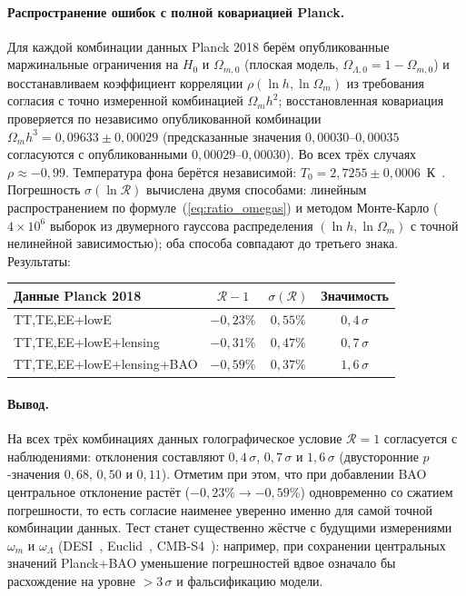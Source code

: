 \documentclass[12pt,a4paper]{article}
\begin{document}
\paragraph{Распространение ошибок с полной ковариацией Planck.}
Для каждой комбинации данных Planck 2018 берём опубликованные маржинальные ограничения на $H_0$ и $\Omega_{m,0}$ (плоская модель, $\Omega_{\Lambda,0}=1-\Omega_{m,0}$) и восстанавливаем коэффициент корреляции $\rho(\ln h, \ln\Omega_m)$ из требования согласия с точно измеренной комбинацией $\Omega_m h^2$; восстановленная ковариация проверяется по независимо опубликованной комбинации $\Omega_m h^3 = 0{,}09633 \pm 0{,}00029$ (предсказанные значения $0{,}00030$--$0{,}00035$ согласуются с опубликованными $0{,}00029$--$0{,}00030$). Во всех трёх случаях $\rho \approx -0{,}99$. Температура фона берётся независимой: $T_0 = 2{,}7255 \pm 0{,}0006$~К~\cite{Fixsen2009}. Погрешность $\sigma(\ln\mathcal{R})$ вычислена двумя способами: линейным распространением по формуле~(\ref{eq:ratio_omegas}) и методом Монте-Карло ($4\times10^6$ выборок из двумерного гауссова распределения $(\ln h, \ln\Omega_m)$ с точной нелинейной зависимостью); оба способа совпадают до третьего знака. Результаты:

\begin{center}
\begin{tabular}{l c c c}
\hline
Данные Planck 2018 & $\mathcal{R}-1$ & $\sigma(\mathcal{R})$ & Значимость \\
\hline
TT,TE,EE+lowE & $-0{,}23\%$ & $0{,}55\%$ & $0{,}4\,\sigma$ \\
TT,TE,EE+lowE+lensing & $-0{,}31\%$ & $0{,}47\%$ & $0{,}7\,\sigma$ \\
TT,TE,EE+lowE+lensing+BAO & $-0{,}59\%$ & $0{,}37\%$ & $1{,}6\,\sigma$ \\
\hline
\end{tabular}
\end{center}

\paragraph{Вывод.}
На всех трёх комбинациях данных голографическое условие $\mathcal{R}=1$ согласуется с наблюдениями: отклонения составляют $0{,}4\,\sigma$, $0{,}7\,\sigma$ и $1{,}6\,\sigma$ (двусторонние $p$-значения $0{,}68$, $0{,}50$ и $0{,}11$). Отметим при этом, что при добавлении BAO центральное отклонение растёт ($-0{,}23\% \to -0{,}59\%$) одновременно со сжатием погрешности, то есть согласие наименее уверенно именно для самой точной комбинации данных. Тест станет существенно жёстче с будущими измерениями $\omega_m$ и $\omega_\Lambda$ (DESI~\cite{DESI2024SV}, Euclid~\cite{Laureijs2011,Euclid2020}, CMB-S4~\cite{Abazajian2016}): например, при сохранении центральных значений Planck+BAO уменьшение погрешностей вдвое означало бы расхождение на уровне $>3\,\sigma$ и фальсификацию модели.
\end{document}
